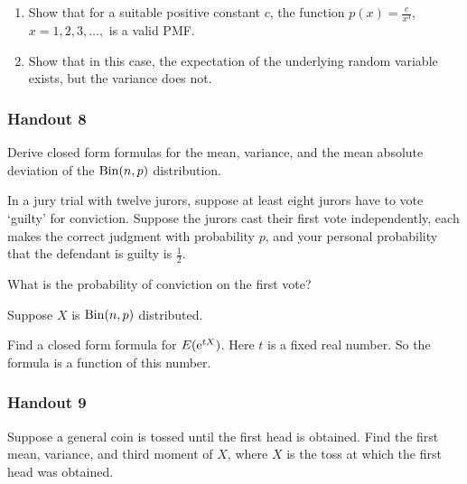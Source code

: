 \begin{problem}[Handout 7, \# 8]
  \begin{enumerate}[label=(\alph*),noitemsep]
  \item Show that for a suitable positive constant \(c\), the function
    \(p(x)=\frac{c}{x^3}\), \(x=1,2,3,\dotsc,\) is a valid PMF.
  \item Show that in this case, the expectation of the underlying random
    variable exists, but the variance does not.
  \end{enumerate}
\end{problem}
\begin{solution*}
\end{solution*}

\subsubsection{Handout 8}
\begin{problem}[Handout 8, \# 4]
  Derive closed form formulas for the mean, variance, and the mean absolute
  deviation of the \(\operatorname{Bin}(n,p)\) distribution.
\end{problem}
\begin{solution*}
\end{solution*}

\begin{problem}[Handout 8, \# 6]
  In a jury trial with twelve jurors, suppose at least eight jurors have to
  vote `guilty' for conviction. Suppose the jurors cast their first vote
  independently, each makes the correct judgment with probability \(p\),
  and your personal probability that the defendant is guilty is
  \(\frac{1}{2}\).

  \noindent What is the probability of conviction on the first vote?
\end{problem}
\begin{solution*}
\end{solution*}

\begin{problem}[Handout 8, \# 11]
  Suppose \(X\) is \(\operatorname{Bin}(n,p)\) distributed.

  \noindent Find a closed form formula for \(E(\mathrm{e}^{tX})\). Here \(t\) is
  a fixed real number. So the formula is a function of this number.
\end{problem}
\begin{solution*}
\end{solution*}

\subsubsection{Handout 9}
\begin{problem}[Handout 9, \# 6]
  Suppose a general coin is tossed until the first head is obtained. Find
  the first mean, variance, and third moment of \(X\), where \(X\) is the
  toss at which the first head was obtained.
\end{problem}
\begin{solution*}
\end{solution*}

